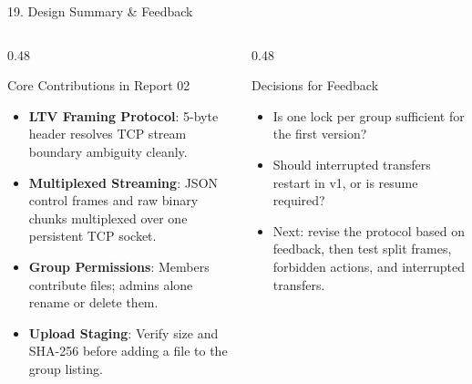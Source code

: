 \documentclass[t, aspectratio=169]{beamer}
\begin{document}
\begin{frame}{19. Design Summary \& Feedback}
\small
\begin{columns}[T]
\begin{column}{0.48\textwidth}
\begin{block}{Core Contributions in Report 02}
\scriptsize
\begin{itemize}
    \setlength{\itemsep}{2.5pt}
    \item \textbf{LTV Framing Protocol}: 5-byte header resolves TCP stream boundary ambiguity cleanly.
    \item \textbf{Multiplexed Streaming}: JSON control frames and raw binary chunks multiplexed over one persistent TCP socket.
    \item \textbf{Group Permissions}: Members contribute files; admins alone rename or delete them.
    \item \textbf{Upload Staging}: Verify size and SHA-256 before adding a file to the group listing.
\end{itemize}
\end{block}
\end{column}

\begin{column}{0.48\textwidth}
\begin{block}{Decisions for Feedback}
\scriptsize
\begin{itemize}
    \setlength{\itemsep}{2.5pt}
    \item Is one lock per group sufficient for the first version?
    \item Should interrupted transfers restart in v1, or is resume required?
    \item Next: revise the protocol based on feedback, then test split frames, forbidden actions, and interrupted transfers.
\end{itemize}
\end{block}
\end{column}
\end{columns}
\end{frame}

\useStyleLogoOnly
\hustthankyou
\end{document}
